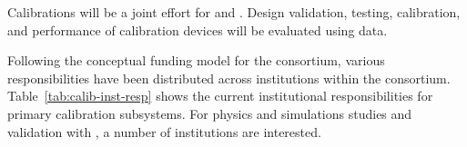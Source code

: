

Calibrations will be a joint effort for \single and \dual. Design validation, testing, calibration, and performance of calibration devices will be evaluated using  data.

Following the conceptual funding model for the consortium, various responsibilities have been distributed across institutions within the consortium. 
Table~\ref{tab:calib-inst-resp} shows the current institutional responsibilities for primary calibration subsystems. 
For physics and simulations studies and validation with , a number of institutions are interested. 


\begin{comment}
\begin{dunetable}
[Institutional responsibility for calibrations]
{p{0.25\textwidth}p{0.65\textwidth}}
{tab:calib-inst-resp}
{Institutional responsibilities in the Calibration Consortium.}   
System & Institutional Responsibility \\ \toprowrule
Laser System & Bern, Hawaii, LIP, Pitt, LANL \\ \colhline
Pulsed Neutron Source & LANL, BU, CSU, UC Davis, Iowa, LIP, MSU, SDSMT \\ 
\end{dunetable}
\end{comment}

